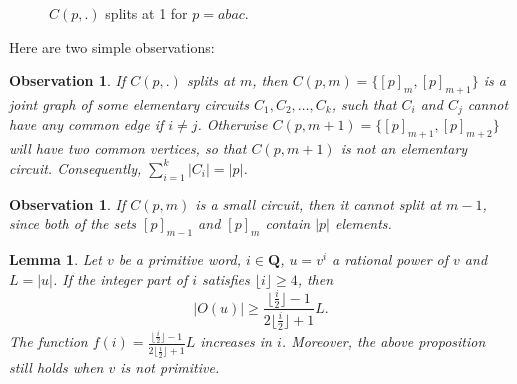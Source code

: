 \documentclass[runningheads,envcountsame,a4paper]{llncs}
\newtheorem{lem}[thm]{Lemma}
\newtheorem{obs}[thm]{Observation}
\begin{document}
\begin{figure}[htbp]
\caption{$C(p,.)$ splits at 1 for $p=abac$.}
\label{fig:split}
\end{figure}



Here are two simple observations:

\begin{obs}\label{obs1}
If $C(p,.)$ {\em splits} at $m$, then $C(p,m)=\{[p]_{m},[p]_{m+1}\}$ is a joint graph of some elementary circuits $C_1,C_2, \ldots, C_k$, such that $C_i$ and $C_j$ cannot have any common edge if $i \neq j$. Otherwise $C(p,m+1)=\{[p]_{m+1},[p]_{m+2}\}$ will have two common vertices, so that $C(p,m+1)$ is not an elementary circuit. Consequently, $\sum_{i=1}^k|C_i|=|p|$.
\end{obs}

\begin{obs}\label{obs2}
If $C(p,m)$ is a small circuit, then it cannot {\em split} at $m-1$, since both of the sets $[p]_{m-1}$ and $[p]_{m}$ contain $|p|$ elements.
\end{obs}

\iffalse
\begin{lem}\label{111}
Let $v$ be a primitive word, $i \in \mathbf{Q}$, $u=v^i$ a rational power of $v$ and $L=|u|$. If the integer part of $i$ satisfies $\lfloor i \rfloor \ge 4$, then 
$$|O(u)|\ge\frac{\lfloor \frac i2 \rfloor-1}{2\lfloor \frac i2 \rfloor+1}L.$$ 
The function $f(i)=\frac{\lfloor \frac i2 \rfloor-1}{2\lfloor \frac i2 \rfloor+1}L$ increases in $i$. Moreover, the above proposition still holds when $v$ is not primitive.

\end{lem}
\end{document}
